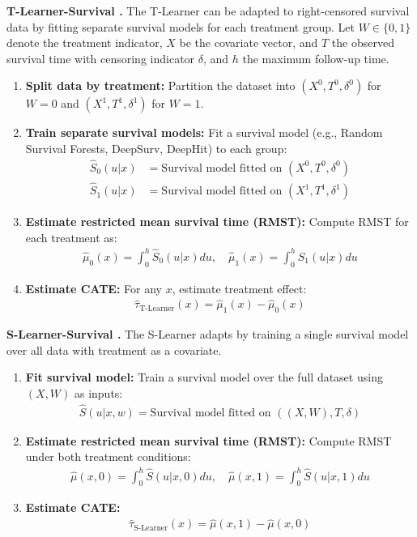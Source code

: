 \textbf{T-Learner-Survival \citep{bo2024ameta,noroozizadeh2025impact}.}
The T-Learner can be adapted to right-censored survival data by fitting separate survival models for each treatment group.
Let $W \in \{0, 1\}$ denote the treatment indicator, $X$ be the covariate vector, and $T$ the observed survival time with censoring indicator $\delta$, and $h$ the maximum follow-up time.

\begin{enumerate}
    \item \textbf{Split data by treatment:} Partition the dataset into $(X^0, T^0, \delta^0)$ for $W=0$ and $(X^1, T^1, \delta^1)$ for $W=1$.
    \item \textbf{Train separate survival models:} Fit a survival model (e.g., Random Survival Forests, DeepSurv, DeepHit) to each group:
    \begin{align*}
        \widehat{S}_0(u | x) &= \text{Survival model fitted on } (X^0, T^0, \delta^0) \\
        \widehat{S}_1(u | x) &= \text{Survival model fitted on } (X^1, T^1, \delta^1)
    \end{align*}
    \item \textbf{Estimate restricted mean survival time (RMST):} Compute RMST for each treatment as:
    \begin{align*}
        \widehat{\mu}_0(x) = \int_0^h \widehat{S}_0(u|x) du, \quad \widehat{\mu}_1(x) = \int_0^h \widehat{S}_1(u|x) du
    \end{align*}
    \item \textbf{Estimate CATE:} For any $x$, estimate treatment effect:
    \begin{align*}
        \widehat{\tau}_{\text{T-Learner}}(x) = \widehat{\mu}_1(x) - \widehat{\mu}_0(x)
    \end{align*}
\end{enumerate}

\textbf{S-Learner-Survival \citep{bo2024ameta,noroozizadeh2025impact}.}
The S-Learner adapts by training a single survival model over all data with treatment as a covariate.

\begin{enumerate}
    \item \textbf{Fit survival model:} Train a survival model over the full dataset using $(X, W)$ as inputs:
    \begin{align*}
        \widehat{S}(u | x, w) = \text{Survival model fitted on } ((X, W), T, \delta)
    \end{align*}
    \item \textbf{Estimate restricted mean survival time (RMST):} Compute RMST under both treatment conditions:
    \begin{align*}
        \widehat{\mu}(x, 0) = \int_0^h \widehat{S}(u|x, 0) du, \quad \widehat{\mu}(x, 1) = \int_0^h \widehat{S}(u|x, 1) du
    \end{align*}
    \item \textbf{Estimate CATE:} 
    \begin{align*}
        \widehat{\tau}_{\text{S-Learner}}(x) = \widehat{\mu}(x,1) - \widehat{\mu}(x,0)
    \end{align*}
\end{enumerate}

